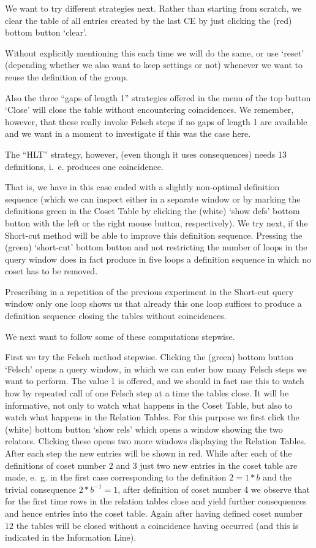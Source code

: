 We want to try different strategies next. Rather than starting from
scratch, we clear the table of all entries created by the last CE by
just clicking the (red) bottom button `clear'.

Without explicitly mentioning this each time we will do the same, or
use `reset' (depending whether we also want to keep settings or not)
whenever we want to reuse the definition of the group.

Also the three ``gaps of length 1'' strategies offered in the menu of
the top button `Close' will close the table without encountering
coincidences. We remember, however, that these really invoke Felsch
steps if no gaps of length 1 are available and we want in a moment
to investigate if this was the case here.

The ``HLT'' strategy, however, (even though it uses consequences) needs
13 definitions, i.~e. produces one coincidence.

That is, we have in this case ended with a slightly non-optimal
definition sequence (which we can inspect either in a separate window
or by marking the definitions green in the Coset Table by clicking
the (white) `show defs' bottom button with the left or the right mouse
button, respectively). We try next, if the Short-cut method will be
able to improve this definition sequence. Pressing the (green)
`short-cut' bottom button and not restricting the number of loops in
the query window does in fact produce in five loops a definition
sequence in which no coset has to be removed.

Prescribing in a repetition of the previous experiment in the
Short-cut query window only one loop shows us that already this one
loop suffices to produce a definition sequence closing the tables
without coincidences.

We next want to follow some of these computations stepwise.

First we try the Felsch method stepwise. Clicking the (green) bottom
button `Felsch' opens a query window, in which we can enter how many
Felsch steps we want to perform. The value 1 is offered, and we
should in fact use this to watch how by repeated call of one Felsch
step at a time the tables close. It will be informative, not only to
watch what happens in the Coset Table, but also to watch what happens
in the Relation Tables. For this purpose we first click the (white)
bottom button `show rels' which opens a window showing the two
relators. Clicking these opens two more windows displaying the
Relation Tables. After each step the new entries will be shown in
red. While after each of the definitions of coset number $2$ and $3$
just two new entries in the coset table are made, e.~g. in the first
case corresponding to the definition $2 = 1*b$ and the trivial
consequence $2*b^{-1} = 1$, after definition of coset number 4 we
observe that for the first time rows in the relation tables close and
yield further consequences and hence entries into the coset
table. Again after having defined coset number $12$ the tables will be
closed without a coincidence having occurred (and this is indicated in
the Information Line).

